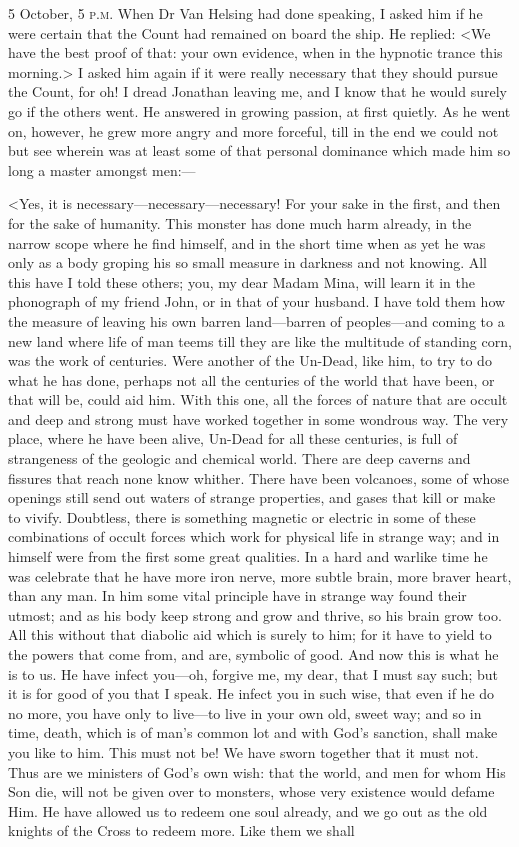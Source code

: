 \begin{diary}{5 October, 5 \textsc{p.m.}}
When Dr Van Helsing had done speaking, I asked him if he were certain that the Count had remained on board the ship. He replied: <We have the best proof of that: your own evidence, when in the hypnotic trance this morning.> I asked him again if it were really necessary that they should pursue the Count, for oh! I dread Jonathan leaving me, and I know that he would surely go if the others went. He answered in growing passion, at first quietly. As he went on, however, he grew more angry and more forceful, till in the end we could not but see wherein was at least some of that personal dominance which made him so long a master amongst men:—

<Yes, it is necessary—necessary—necessary! For your sake in the first, and then for the sake of humanity. This monster has done much harm already, in the narrow scope where he find himself, and in the short time when as yet he was only as a body groping his so small measure in darkness and not knowing. All this have I told these others; you, my dear Madam Mina, will learn it in the phonograph of my friend John, or in that of your husband. I have told them how the measure of leaving his own barren land—barren of peoples—and coming to a new land where life of man teems till they are like the multitude of standing corn, was the work of centuries. Were another of the Un-Dead, like him, to try to do what he has done, perhaps not all the centuries of the world that have been, or that will be, could aid him. With this one, all the forces of nature that are occult and deep and strong must have worked together in some wondrous way. The very place, where he have been alive, Un-Dead for all these centuries, is full of strangeness of the geologic and chemical world. There are deep caverns and fissures that reach none know whither. There have been volcanoes, some of whose openings still send out waters of strange properties, and gases that kill or make to vivify. Doubtless, there is something magnetic or electric in some of these combinations of occult forces which work for physical life in strange way; and in himself were from the first some great qualities. In a hard and warlike time he was celebrate that he have more iron nerve, more subtle brain, more braver heart, than any man. In him some vital principle have in strange way found their utmost; and as his body keep strong and grow and thrive, so his brain grow too. All this without that diabolic aid which is surely to him; for it have to yield to the powers that come from, and are, symbolic of good. And now this is what he is to us. He have infect you—oh, forgive me, my dear, that I must say such; but it is for good of you that I speak. He infect you in such wise, that even if he do no more, you have only to live—to live in your own old, sweet way; and so in time, death, which is of man's common lot and with God's sanction, shall make you like to him. This must not be! We have sworn together that it must not. Thus are we ministers of God's own wish: that the world, and men for whom His Son die, will not be given over to monsters, whose very existence would defame Him. He have allowed us to redeem one soul already, and we go out as the old knights of the Cross to redeem more. Like them we shall 
\end{diary}
